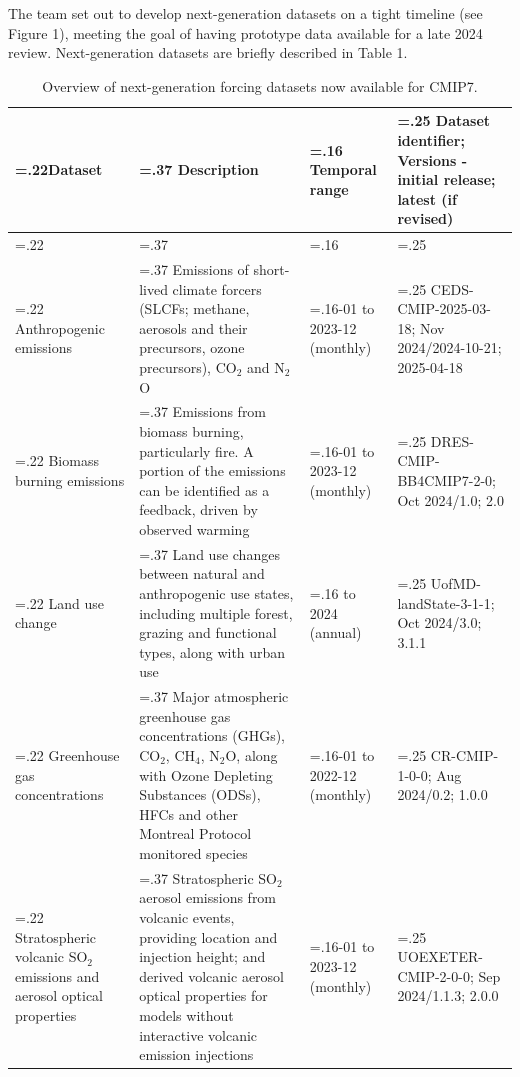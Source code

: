 \documentclass{ametsocV6.1}
\begin{document}
The team set out to develop next-generation datasets on a tight timeline (see Figure 1), meeting the goal of having prototype data available for a late 2024 review. Next-generation datasets are briefly described in Table 1.


\begin{table}[ht]
	\renewcommand{\arraystretch}{1.5}
	\renewcommand\tabularxcolumn[1]{m{#1}}%
	\scriptsize
	\centering
	\caption{Overview of next-generation forcing datasets now available for CMIP7.}
	\begin{tabularx}{1\textwidth} {
		| >{\centering\arraybackslash\hsize=.22\hsize}X
		| >{\centering\arraybackslash\hsize=.37\hsize}X
		| >{\centering\arraybackslash\hsize=.16\hsize}X
		| >{\centering\arraybackslash\hsize=.25\hsize}X | }
	\hline
	\textbf{Dataset} & \textbf{Description} & \textbf{Temporal range} & \textbf{Dataset identifier; Versions - initial release; latest (if revised)} \\
	\hline
	\multicolumn{4}{l}{\textbf{Forcing data prepared for use in the CMIP7 DECK experiments}} \\ \hline
	Anthropogenic emissions & Emissions of short-lived climate forcers (SLCFs; methane, aerosols and their precursors, ozone precursors), CO$_{2}$ and N$_{2}$O & 1750-01 to 2023-12 (monthly) & CEDS-CMIP-2025-03-18; Nov 2024/2024-10-21; 2025-04-18 \\ \hline
	Biomass burning emissions & Emissions from biomass burning, particularly fire. A portion of the emissions can be identified as a feedback, driven by observed warming & 1750-01 to 2023-12 (monthly) & DRES-CMIP-BB4CMIP7-2-0; Oct 2024/1.0; 2.0 \\ \hline
	Land use change & Land use changes between natural and anthropogenic use states, including multiple forest, grazing and functional types, along with urban use & 850 to 2024 (annual) & UofMD-landState-3-1-1; Oct 2024/3.0; 3.1.1 \\ \hline
	Greenhouse gas concentrations & Major atmospheric greenhouse gas concentrations (GHGs), CO$_{2}$, CH$_{4}$, N$_{2}$O, along with Ozone Depleting Substances (ODSs), HFCs and other Montreal Protocol monitored species & 0001-01 to 2022-12 (monthly) & CR-CMIP-1-0-0; Aug 2024/0.2; 1.0.0 \\ \hline
	Stratospheric volcanic SO$_{2}$ emissions and aerosol optical properties & Stratospheric SO$_{2}$ aerosol emissions from volcanic events, providing location and injection height; and derived volcanic aerosol optical properties for models without interactive volcanic emission injections & 1750-01 to 2023-12 (monthly) & UOEXETER-CMIP-2-0-0; Sep 2024/1.1.3; 2.0.0 \\ \hline

\end{tabularx}
\end{table}
\end{document}
